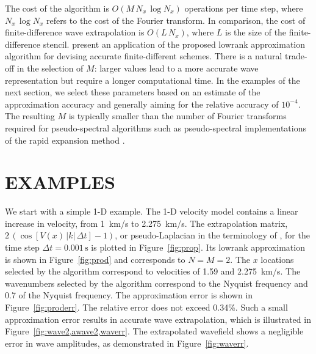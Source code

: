 The cost of the algorithm is $O(M\,N_x\,\log{N_x})$ operations per time
 step, where $N_x\,\log{N_x}$ refers to the cost of the Fourier
 transform. In comparison, the cost of finite-difference wave
 extrapolation is $O(L\,N_x)$, where $L$ is the size of the
 finite-difference stencil. \cite{lfd} present an application of the proposed
 lowrank approximation algorithm for devising accurate
 finite-different schemes. There is a natural trade-off in the
 selection of $M$: larger values lead to a more accurate wave
 representation but require a longer computational time. In the
 examples of the next section, we select these parameters based on an
 estimate of the approximation accuracy and generally aiming for the
 relative accuracy of $10^{-4}$. The resulting $M$ is typically
 smaller than the number of Fourier transforms required for
 pseudo-spectral algorithms such as pseudo-spectral implementations of
 the rapid expansion method \cite[]{rem}. 

\section{EXAMPLES}

We start with a simple 1-D example. The 1-D velocity model contains a
linear increase in velocity, from 1~km/s to 2.275~km/s. The
extrapolation matrix, $2\,(\cos\left[V(x)\,|k|\,\Delta t\right]-1)$,
or pseudo-Laplacian in the terminology of \cite{etgen}, for the time
step $\Delta t=0.001\,\mbox{s}$ is plotted in
Figure~\ref{fig:prop}. Its lowrank approximation is shown in
Figure~\ref{fig:prod} and corresponds to $N=M=2$. The $x$ locations
selected by the algorithm correspond to velocities of 1.59 and
2.275~km/s. The wavenumbers selected by the algorithm correspond to
the Nyq\-uist frequency and 0.7 of the Nyquist frequency. The
approximation error is shown in Figure~\ref{fig:proderr}. The relative
error does not exceed 0.34\%. Such a small approximation error results
in accurate wave extrapolation, which is illustrated in
Figure~\ref{fig:wave2,awave2,waverr}. The extrapolated wavefield shows
a negligible error in wave amplitudes, as demonstrated in
Figure~\ref{fig:waverr}.



